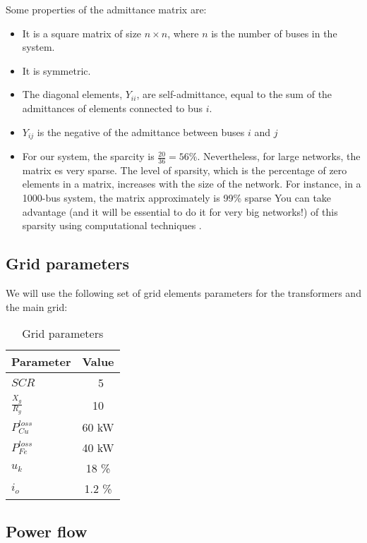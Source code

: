 \documentclass[a4paper,11pt, titlepage, twoside]{article}
\begin{document}
Some properties of the admittance matrix are:
\begin{itemize}[itemsep=0pt]
    \item It is a square matrix of size $n \times n$, where $n$ is the number of buses in the system.
    \item It is symmetric.
    \item The diagonal elements, $Y_{ii}$, are self-admittance, equal to the sum of the admittances of elements connected to bus $i$.
    \item $Y_{ij}$ is the negative of the admittance between buses $i$ and $j$
    \item  For our system, the sparcity is $\frac{20}{36}= 56\%$. Nevertheless, for large networks, the matrix es very sparse. The level of sparsity, which is the percentage of zero elements in a matrix, increases with the size of the network.
    For instance, in a 1000-bus system, the matrix approximately is 99\% sparse You can take advantage (and it will be essential to do it for very big networks!) of this sparsity using computational techniques \cite{sparcity}.
\end{itemize}

\subsection{Grid parameters}

We will use the following set of grid elements parameters for the transformers and the main grid:
\begin{table}[h]
    \centering
    \renewcommand{\arraystretch}{1.2}
    \begin{tabular}{l|c}
    \hline
    \textbf{Parameter} & \textbf{Value} \\
    \hline
    $SCR$ & \ 5 \\
    $\frac{X_g}{R_g}$ & 10 \\
    $P_{Cu}^{loss}$ & 60 kW \\
    $P_{Fe}^{loss}$ & 40 kW \\
    $u_k$ & 18 \%  \\
    $i_o$ & 1.2 \% \\
    \hline
    \end{tabular}
    \caption{Grid parameters \cite{paperbase}}
    \label{tab:gridparameters}
    \end{table}


\subsection{Power flow }
\end{document}
